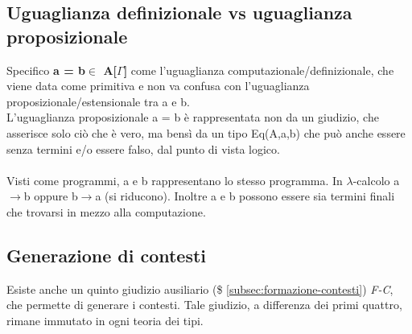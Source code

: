 \documentclass[10pt,a4paper, italian]{book}
\begin{document}
\subsection{Uguaglianza definizionale vs uguaglianza proposizionale}
\label{subsec:uguaglianza-computazionale-proposizionale}
Specifico \textbf{a = b$\in$ A[$\Gamma$]} come l'uguaglianza computazionale/definizionale, che viene data come primitiva e non va confusa con l'uguaglianza proposizionale/estensionale tra a e b.\\L'uguaglianza proposizionale a = b \`e rappresentata non da un giudizio, che asserisce solo ci\`o che \`e vero, ma bens\`i da un tipo Eq(A,a,b) che pu\`o anche essere senza termini e/o essere falso, dal punto di vista logico.\\\\
Visti come programmi, a e b rappresentano lo stesso programma. In $\lambda$-calcolo a$\rightarrow$b oppure b$\rightarrow$a (si riducono). Inoltre a e b possono essere sia termini finali che trovarsi in mezzo alla computazione.
\subsection{Generazione di contesti}
\label{subsec:generazione-di-contesti}
Esiste anche un quinto giudizio ausiliario (\$ \ref{subsec:formazione-contesti}) \textit{F-C}, che permette di generare i contesti. Tale giudizio, a differenza dei primi quattro, rimane immutato in ogni teoria dei tipi.
\end{document}
